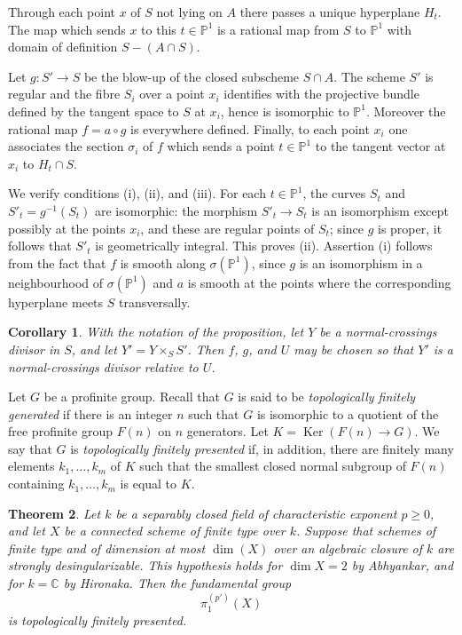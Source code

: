 \documentclass[11pt]{article}
\theoremstyle{plain}
\newtheorem{theorem}{Theorem}[section]
\newtheorem{corollary}[theorem]{Corollary}
\theoremstyle{definition}
\theoremstyle{remark}
\DeclareMathOperator{\Ker}{Ker}
\begin{document}
Through each point $x$ of $S$ not lying on $A$ there passes a unique hyperplane $H_t$. The map which sends $x$ to this $t\in\mathbb P^1$ is a rational map from $S$ to $\mathbb P^1$ with domain of definition $S-(A\cap S)$.

Let $g:S'\to S$ be the blow-up of the closed subscheme $S\cap A$. The scheme $S'$ is regular and the fibre $S_i$ over a point $x_i$ identifies with the projective bundle defined by the tangent space to $S$ at $x_i$, hence is isomorphic to $\mathbb P^1$. Moreover the rational map $f=a\circ g$ is everywhere defined. Finally, to each point $x_i$ one associates the section $\sigma_i$ of $f$ which sends a point $t\in\mathbb P^1$ to the tangent vector at $x_i$ to $H_t\cap S$.

We verify conditions \textup{(i)}, \textup{(ii)}, and \textup{(iii)}. For each $t\in\mathbb P^1$, the curves $S_t$ and $S'_t=g^{-1}(S_t)$ are isomorphic: the morphism $S'_t\to S_t$ is an isomorphism except possibly at the points $x_i$, and these are regular points of $S_t$; since $g$ is proper, it follows that $S'_t$ is geometrically integral. This proves \textup{(ii)}. Assertion \textup{(i)} follows from the fact that $f$ is smooth along $\sigma(\mathbb P^1)$, since $g$ is an isomorphism in a neighbourhood of $\sigma(\mathbb P^1)$ and $a$ is smooth at the points where the corresponding hyperplane meets $S$ transversally.

\begin{corollary}
With the notation of the proposition, let $Y$ be a normal-crossings divisor in $S$, and let $Y'=Y\times_S S'$. Then $f$, $g$, and $U$ may be chosen so that $Y'$ is a normal-crossings divisor relative to $U$.
\end{corollary}

Let $G$ be a profinite group. Recall that $G$ is said to be \emph{topologically finitely generated} if there is an integer $n$ such that $G$ is isomorphic to a quotient of the free profinite group $F(n)$ on $n$ generators. Let $K=\Ker(F(n)\to G)$. We say that $G$ is \emph{topologically finitely presented} if, in addition, there are finitely many elements $k_1,\ldots,k_m$ of $K$ such that the smallest closed normal subgroup of $F(n)$ containing $k_1,\ldots,k_m$ is equal to $K$.

\begin{theorem}
Let $k$ be a separably closed field of characteristic exponent $p\ge0$, and let $X$ be a connected scheme of finite type over $k$. Suppose that schemes of finite type and of dimension at most $\dim(X)$ over an algebraic closure of $k$ are strongly desingularizable. This hypothesis holds for $\dim X=2$ by Abhyankar, and for $k=\mathbb C$ by Hironaka. Then the fundamental group
\[
 \pi_1^{(p')}(X)
\]
is topologically finitely presented.
\end{theorem}
\end{document}

